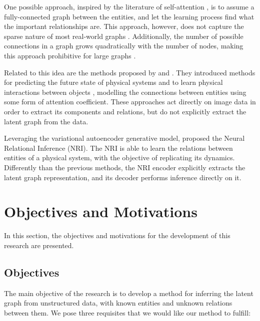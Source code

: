 \documentclass[12pt,a4paper]{article}
\begin{document}
	One possible approach, inspired by the literature of self-attention \citep{Vaswani2017}, is to assume a fully-connected graph between the entities, and let the learning process find what the important relationships are. This approach, however, does not capture the sparse nature of most real-world graphs \citep{Newman2019}. Additionally, the number of possible connections in a graph grows quadratically with the number of nodes, making this approach prohibitive for large graphs \citep{Battaglia2018}.
	
	Related to this idea are the methods proposed by \textcite{Watters2017} and \textcite{VanSteenkiste2018}. They introduced methods for predicting the future state of physical systems \citep{Watters2017} and to learn physical interactions between objects \citep{VanSteenkiste2018}, modelling the connections between entities using some form of attention coefficient. These approaches act directly on image data in order to extract its components and relations, but do not explicitly extract the latent graph from the data.
	
	Leveraging the variational autoencoder generative model, \textcite{KipfNRI2018} proposed the Neural Relational Inference (NRI). The NRI is able to learn the relations between entities of a physical system, with the objective of replicating its dynamics. Differently than the previous methods, the NRI encoder explicitly extracts the latent graph representation, and its decoder performs inference directly on it.
	
	\section{Objectives and Motivations}
	\label{sec:Objectives_and_motivations}
	
	In this section, the objectives and motivations for the development of this research are presented.
	
	\subsection{Objectives}
	
	The main objective of the research is to develop a method for inferring the latent graph from unstructured data, with known entities and unknown relations between them. We pose three requisites that we would like our method to fulfill:
	
\end{document}
